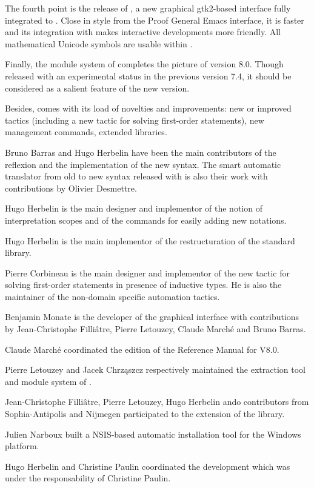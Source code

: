 The fourth point is the release of \CoqIDE{}, a new graphical
gtk2-based interface fully integrated to {\Coq}. Close in style from
the Proof General Emacs interface, it is faster and its integration
with {\Coq} makes interactive developments more friendly. All
mathematical Unicode symbols are usable within \CoqIDE{}.

Finally, the module system of {\Coq} completes the picture of {\Coq}
version 8.0. Though released with an experimental status in the previous
version 7.4, it should be considered as a salient feature of the new
version.

Besides, {\Coq} comes with its load of novelties and improvements: new
or improved tactics (including a new tactic for solving first-order
statements), new management commands, extended libraries.

\bigskip

Bruno Barras and Hugo Herbelin have been the main contributors of the 
reflexion and the implementation of the new syntax. The smart
automatic translator from old to new syntax released with {\Coq} is also
their work with contributions by Olivier Desmettre.

Hugo Herbelin is the main designer and implementor of the notion of
interpretation scopes and of the commands for easily adding new notations.

Hugo Herbelin is the main implementor of the restructuration of the
standard library.

Pierre Corbineau is the main designer and implementor of the new
tactic for solving first-order statements in presence of inductive
types. He is also the maintainer of the non-domain specific automation
tactics.

Benjamin Monate is the developer of the \CoqIDE{} graphical
interface with contributions by Jean-Christophe Filliâtre, Pierre
Letouzey, Claude Marché and Bruno Barras.

Claude Marché coordinated the edition of the Reference Manual for
 \Coq{} V8.0.

Pierre Letouzey and Jacek Chrz\k{a}szcz respectively maintained the
extraction tool and module system of {\Coq}.

Jean-Christophe Filliâtre, Pierre Letouzey, Hugo Herbelin ando
contributors from Sophia-Antipolis and Nijmegen participated to the
extension of the library.

Julien Narboux built a NSIS-based automatic {\Coq} installation tool for
the Windows platform.

Hugo Herbelin and Christine Paulin coordinated the development which
was under the responsability of Christine Paulin.

